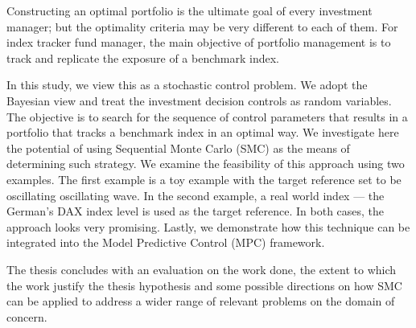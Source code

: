 


\begin{abstracts}        %
  Constructing an optimal portfolio is the ultimate goal of every investment manager; but the optimality criteria may be very different to each of them. For index tracker fund manager, the main objective of portfolio management is to track and replicate the exposure of a benchmark index.

In this study, we view this as a stochastic control problem. We adopt the Bayesian view and treat the investment decision controls as random variables. The objective is to search for the sequence of control parameters that results in a portfolio that tracks a benchmark index in an optimal way. We investigate here the potential of using Sequential Monte Carlo (SMC) as the means of determining such strategy. We examine the feasibility of this approach using two examples. The first example is a toy example with the target reference set to be oscillating oscillating wave. In the second example, a real world index --- the German's DAX index level is used as the target reference. In both cases, the approach looks very promising. Lastly, we demonstrate how this technique can be integrated into the Model Predictive Control (MPC) framework.

  The thesis concludes with an evaluation on the work done, the extent
  to which the work justify the thesis hypothesis and some possible
  directions on how SMC can be applied to address
  a wider range of relevant problems on the domain of concern.
\end{abstracts}




